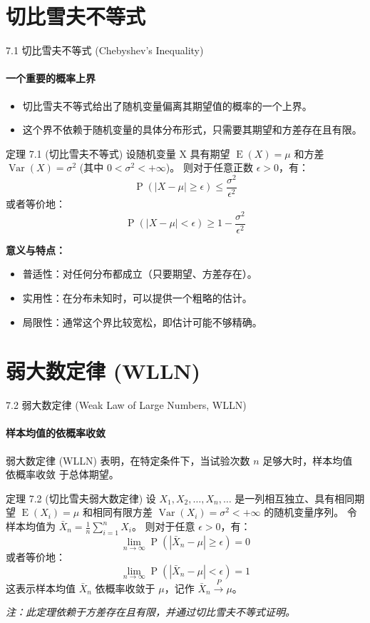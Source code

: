 \documentclass[UTF8]{beamer}
\DeclareMathOperator{\E}{\operatorname{E}}
\DeclareMathOperator{\Var}{\operatorname{Var}}
\DeclareMathOperator{\Prob}{\operatorname{P}}
\begin{document}
\section{切比雪夫不等式}
\begin{frame}[shrink=5]{7.1 切比雪夫不等式 (Chebyshev's Inequality)}
    \framesubtitle{一个重要的概率上界}
    \begin{itemize}
        \item 切比雪夫不等式给出了随机变量偏离其期望值的概率的一个\alert{上界}。
        \item 这个界不依赖于随机变量的具体分布形式，只需要其\alert{期望}和\alert{方差}存在且有限。
    \end{itemize}
    \pause
    \begin{block}{定理 7.1 (切比雪夫不等式)}
        设随机变量 X 具有期望 $\E(X) = \mu$ 和方差 $\Var(X) = \sigma^2$ (其中 $0 < \sigma^2 < +\infty$)。
        则对于任意正数 $\epsilon > 0$，有：
        \[ \Prob(|X - \mu| \geq \epsilon) \leq \frac{\sigma^2}{\epsilon^2} \]
        或者等价地：
        \[ \Prob(|X - \mu| < \epsilon) \geq 1 - \frac{\sigma^2}{\epsilon^2} \]
    \end{block}
    \pause
    \textbf{意义与特点：}
    \begin{itemize}
        \item \alert{普适性}：对任何分布都成立（只要期望、方差存在）。
        \item \alert{实用性}：在分布未知时，可以提供一个粗略的估计。
        \item \alert{局限性}：通常这个界比较宽松，即估计可能不够精确。
    \end{itemize}
\end{frame}

\section{弱大数定律 (WLLN)}
\begin{frame}[shrink=5]{7.2 弱大数定律 (Weak Law of Large Numbers, WLLN)}
    \framesubtitle{样本均值的依概率收敛}
    弱大数定律 (WLLN) 表明，在特定条件下，当试验次数 $n$ 足够大时，样本均值 \alert{依概率收敛} 于总体期望。
    \vspace{0.3cm}

    \begin{block}{定理 7.2 (切比雪夫弱大数定律)}
        设 $X_1, X_2, \dots, X_n, \dots$ 是一列\alert{相互独立}、具有相同期望 $\E(X_i) = \mu$ 和相同\alert{有限方差} $\Var(X_i) = \sigma^2 < +\infty$ 的随机变量序列。
        令样本均值为 $\bar{X}_n = \frac{1}{n} \sum_{i=1}^{n} X_i$。
        则对于任意 $\epsilon > 0$，有：
        \[ \lim_{n \to \infty} \Prob(|\bar{X}_n - \mu| \geq \epsilon) = 0 \]
        或者等价地：
        \[ \lim_{n \to \infty} \Prob(|\bar{X}_n - \mu| < \epsilon) = 1 \]
        这表示样本均值 $\bar{X}_n$ \alert{依概率收敛}于 $\mu$，记作 $\bar{X}_n \xrightarrow{P} \mu$。
    \end{block}
    \vspace{0.3cm}
    \footnotesize
    \textit{注：此定理依赖于方差存在且有限，并通过切比雪夫不等式证明。}
\end{frame}
\end{document}
